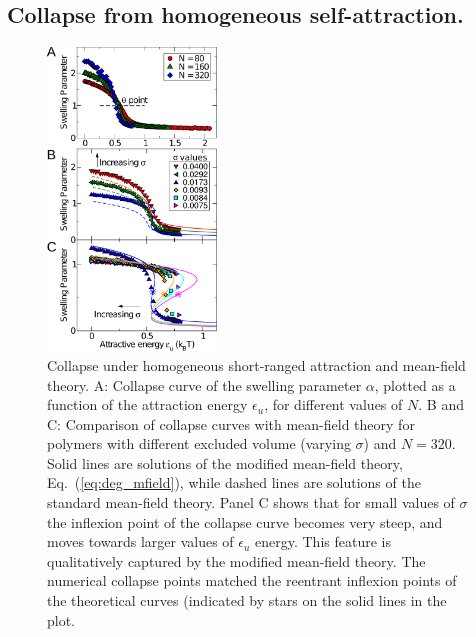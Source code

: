 \documentclass[
preprint,
a4paper,
12pt,
superscriptaddress,
pre]{revtex4}
\begin{document}

\subsection*{Collapse from homogeneous self-attraction. }


\begin{figure}
  \centering
  \includegraphics[width=0.4\textwidth]{fig2}
  \caption{Collapse under homogeneous short-ranged attraction and
    mean-field theory. A: Collapse curve of the swelling parameter
    $\alpha$, plotted as a function of the attraction energy
    $\epsilon_u$, for different values of $N$. B and C: Comparison of
    collapse curves with mean-field theory for polymers with different
    excluded volume (varying $\sigma$) and $N=320$.  Solid lines are
    solutions of the modified mean-field theory,
    Eq.~(\ref{eq:deg_mfield}), while dashed lines are solutions of the
    standard mean-field theory. Panel C shows that for small values of
    $\sigma$ the inflexion point of the collapse curve becomes very
    steep, and moves towards larger values of $\epsilon_u$
    energy. This feature is qualitatively captured by the modified
    mean-field theory. The numerical collapse points
    matched the reentrant inflexion points of the theoretical curves
    (indicated by stars on the solid lines in the plot.  }
  \label{fig:2}
\end{figure}
\end{document}

